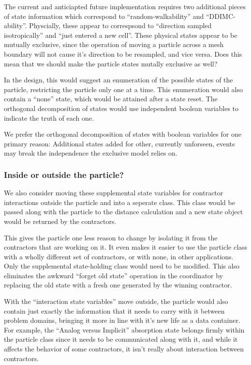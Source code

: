 \documentclass[memo]{ResearchNote}
\begin{document}
The current and anticiapted future implementation requires two
additional pieces of state information which correspond to
``random-walkability'' and ``DDIMC-ability''. Physcially, these appear
to correspsond to ``direction sampled isotropically'' and ``just
entered a new cell''. These physical states appear to be mutually
exclusive, since the operation of moving a particle across a mesh
boundary will not cause it's direction to be resampled, and vice
versa. Does this mean that we should make the particle states mutally
exclusive as well?

In the design, this would suggest an enumeration of the possible
states of the particle, restricting the particle only one at a time.
This enumeration would also contain a ``none'' state, which would be
attained after a state reset. The orthogonal decomposition of states
would use independent boolean variables to indicate the truth of each
one.

We prefer the orthogonal decomposition of states with boolean
variables for one primary reason: Additional states added for other,
currently unforseen, events may break the independence the exclusive
model relies on.

\subsubsection{Inside or outside the particle?}

We also consider moving these supplemental state variables for
contractor interactions outside the particle and into a seperate
class. This class would be passed along with the particle to the
distance calculation and a new state object would be returned by the
contractors.

This gives the particle one less reason to change by isolating it from
the contractors that are working on it. It even makes it easier to use
the particle class with a wholly different set of contractors, or with
none, in other applications. Only the supplemental state-holding class
would need to be modified.  This also eliminates the awkward ``forget
old state'' operation in the coordinator by replacing the old state
with a fresh one generated by the winning contractor.

With the ``interaction state variables'' move outside, the particle
would also contain just exactly the information that it needs to carry
with it between problem domains, bringing it more in line with it's
new life as a data container. For example, the ``Analog versus
Implicit'' absorption state belongs firmly within the particle class
since it needs to be communicated along with it, and while it affects
the behavior of some contractors, it isn't really about interaction
between contractors.
\end{document}
